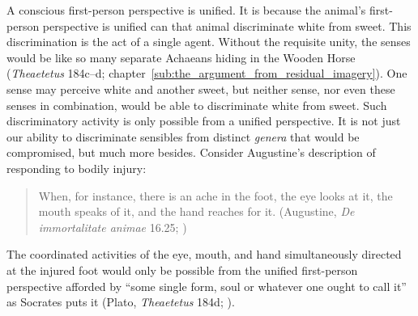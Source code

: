 A conscious first-person perspective is unified. It is because the animal's first-person perspective is unified can that animal discriminate white from sweet. This discrimination is the act of a single agent. Without the requisite unity, the senses would be like so many separate Achaeans hiding in the Wooden Horse (\emph{Theaetetus} 184c–d; chapter~\ref{sub:the_argument_from_residual_imagery}). One sense may perceive white and another sweet, but neither sense, nor even these senses in combination, would be able to discriminate white from sweet. Such discriminatory activity is only possible from a unified perspective. It is not just our ability to discriminate sensibles from distinct \emph{genera} that would be compromised, but much more besides. Consider Augustine's description of responding to bodily injury:
\begin{quote}
	When, for instance, there is an ache in the foot, the eye looks at it, the mouth speaks of it, and the hand reaches for it. (Augustine, \emph{De immortalitate animae} 16.25; \citealt[46]{Schopp:1947df})
\end{quote}
The coordinated activities of the eye, mouth, and hand simultaneously directed at the injured foot would only be possible from the unified first-person perspective afforded by ``some single form, soul or whatever one ought to call it'' as Socrates puts it (Plato, \emph{Theaetetus} 184d; \citealt[315]{Burnyeat:1990dp}).



